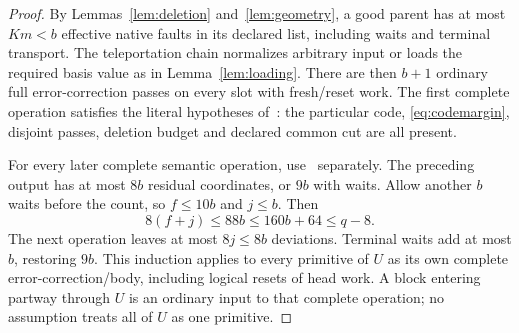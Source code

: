 \begin{proof}
By Lemmas~\ref{lem:deletion} and~\ref{lem:geometry}, a good parent has at most $Km<b$ effective native faults in its declared list, including waits and terminal transport. The teleportation chain normalizes arbitrary input or loads the required basis value as in Lemma~\ref{lem:loading}. There are then $b+1$ ordinary full error-correction passes on every slot with fresh/reset work. The first complete operation satisfies the literal hypotheses of~\cite[Lemma~13.1]{DMMemory2026}: the particular code, \eqref{eq:codemargin}, disjoint passes, deletion budget and declared common cut are all present.

For every later complete semantic operation, use~\cite[Lemma~5.2]{DMMemory2026} separately. The preceding output has at most $8b$ residual coordinates, or $9b$ with waits. Allow another $b$ waits before the count, so $f\le10b$ and $j\le b$. Then
\begin{equation}\label{eq:88b}
 8(f+j)\le88b\le160b+64\le q-8.
\end{equation}
The next operation leaves at most $8j\le8b$ deviations. Terminal waits add at most $b$, restoring $9b$. This induction applies to every primitive of $U$ as its own complete error-correction/body, including logical resets of head work. A block entering partway through $U$ is an ordinary input to that complete operation; no assumption treats all of $U$ as one primitive.


\end{proof}

